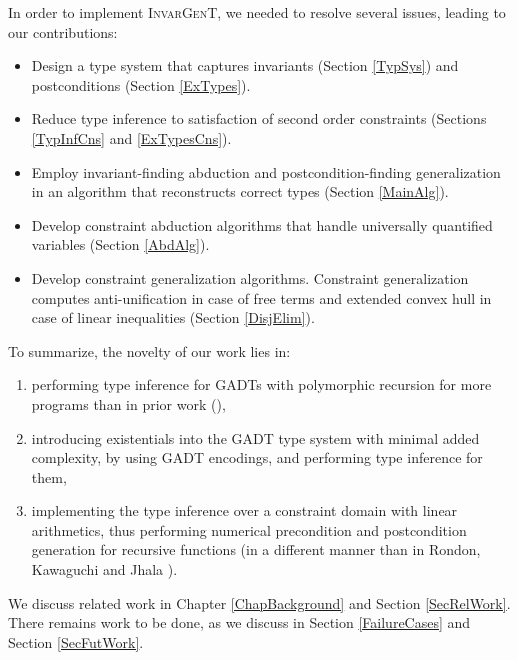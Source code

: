 \documentclass{article}
\newcommand{\tmname}[1]{\textsc{#1}}
\begin{document}
In order to implement {\tmname{InvarGenT}}, we needed to resolve several
issues, leading to our contributions:
\begin{itemize}
  \item Design a type system that captures invariants (Section \ref{TypSys})
  and postconditions (Section \ref{ExTypes}).
  
  \item Reduce type inference to satisfaction of second order constraints
  (Sections \ref{TypInfCns} and \ref{ExTypesCns}).
  
  \item Employ invariant-finding abduction and postcondition-finding
  generalization in an algorithm that reconstructs correct types (Section
  \ref{MainAlg}).
  
  \item Develop constraint abduction algorithms that handle universally
  quantified variables (Section \ref{AbdAlg}).
  
  \item Develop constraint generalization algorithms. Constraint
  generalization computes anti-unification in case of free terms and extended
  convex hull in case of linear inequalities (Section \ref{DisjElim}).
\end{itemize}
To summarize, the novelty of our work lies in:
\begin{enumerate}
  \item performing type inference for GADTs with polymorphic recursion for
  more programs than in prior work ({\cite{PointwiseGADTs}}),
  
  \item introducing existentials into the GADT type system with minimal added
  complexity, by using GADT encodings, and performing type inference for them,
  
  \item implementing the type inference over a constraint domain with linear
  arithmetics, thus performing numerical precondition and postcondition
  generation for recursive functions (in a different manner than in Rondon,
  Kawaguchi and Jhala {\cite{DSolvePaper}}).
\end{enumerate}
We discuss related work in Chapter \ref{ChapBackground} and Section
\ref{SecRelWork}. There remains work to be done, as we discuss in Section
\ref{FailureCases} and Section \ref{SecFutWork}.
\end{document}

